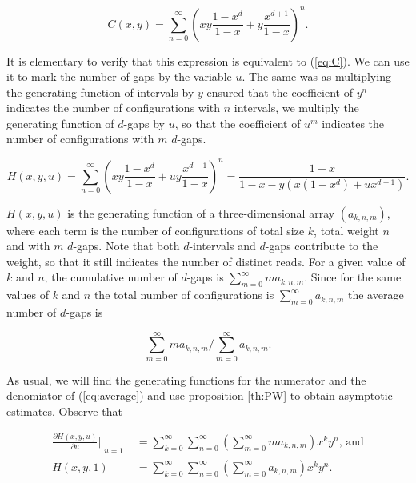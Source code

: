 \documentclass{article}
\begin{document}
\begin{equation}
\label{eq:C2ndform}
C(x,y) = \sum_{n=0}^\infty \left(xy\frac{1-x^d}{1-x} +
y\frac{x^{d+1}}{1-x}\right)^n.
\end{equation}

It is elementary to verify that this expression is equivalent to
(\ref{eq:C}). We can use it to mark the number of gaps by the variable
$u$. The same was as multiplying the generating function of intervals by
$y$ ensured that the coefficient of $y^n$ indicates the number of
configurations with $n$ intervals, we multiply the generating function of
$d$-gaps by $u$, so that the coefficient of $u^m$ indicates the number of
configurations with $m$ $d$-gaps.

\begin{equation*}
H(x,y,u) = \sum_{n=0}^\infty \left(xy\frac{1-x^d}{1-x} +
uy\frac{x^{d+1}}{1-x}\right)^n
= \frac{1-x}{1-x-y\left(x(1-x^d) +ux^{d+1}\right)}.
\end{equation*}

$H(x,y,u)$ is the generating function of a three-dimensional array
$(a_{k,n,m})$, where each term is the number of configurations of total
size $k$, total weight $n$ and with $m$ $d$-gaps. Note that both
$d$-intervals and $d$-gaps contribute to the weight, so that it still
indicates the number of distinct reads. For a given value of $k$ and $n$,
the cumulative number of $d$-gaps is $\sum_{m=0}^\infty ma_{k,n,m}$. Since
for the same values of $k$ and $n$ the total number of configurations is
$\sum_{m=0}^\infty a_{k,n,m}$ the average number of $d$-gaps is

\begin{equation}
\label{eq:average}
\sum_{m=0}^\infty ma_{k,n,m}\Big/\sum_{m=0}^\infty a_{k,n,m}.
\end{equation}

As usual, we will find the generating functions for the numerator and the
denomiator of (\ref{eq:average}) and use proposition \ref{th:PW} to obtain
asymptotic estimates. Observe that

\begin{equation*}
\begin{split}
\frac{\partial H(x,y,u)}{\partial u}\Bigr|_{\substack{\\u=1}} &=
\sum_{k=0}^\infty\sum_{n=0}^\infty
\left(\sum_{m=0}^\infty ma_{k,n,m}\right) x^ky^n \text{, and} \\
H(x,y,1) &= \sum_{k=0}^\infty\sum_{n=0}^\infty
\left(\sum_{m=0}^\infty a_{k,n,m} \right)x^ky^n.
\end{split}
\end{equation*}
\end{document}
